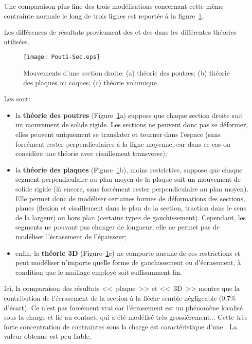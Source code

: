 Une comparaison plus fine des trois modélisations concernant cette même contrainte normale
le long de trois lignes est reportée à la figure~\ref{Pout1-sec}.

\medskip
Les différences de résultats proviennent des 
et des  dans les différentes théories utilisées.
\begin{figure}[ht]
\centering
\texttt{[image: Pout1-Sec.eps]}
\caption{Mouvements d'une section droite: (a) théorie des poutres;
(b) théorie des plaques ou coques; (c) théorie volumique}\label{Pout1-sec}
\end{figure}

\medskip
Les  sont:
\begin{itemize}
\item la \textbf{théorie des poutres} (Figure~\ref{Pout1-sec}a) suppose que chaque section droite suit un mouvement de solide rigide. Les sections ne peuvent donc pas se déformer, elles peuvent uniquement se translater et tourner dans l'espace (sans forcément rester perpendiculaires à la ligne moyenne, car dans ce cas on considère une théorie avec cisaillement transverse);
\item la \textbf{théorie des plaques} (Figure~\ref{Pout1-sec}b), moins restrictive, suppose que chaque segment perpendiculaire au plan moyen de la plaque suit un mouvement de solide rigide (là encore, sans forcément rester perpendiculaire au plan moyen). Elle permet donc de modéliser certaines formes de déformations des sections, planes (flexion et cisaillement dans le plan de la section, traction dans le sens de la largeur) ou hors plan (certains types de gauchissement). Cependant, les segments ne pouvant pas changer de longueur, elle ne permet pas de modéliser l'écrasement de l'épaisseur;
\item enfin, la \textbf{théorie 3D} (Figure~\ref{Pout1-sec}c) ne comporte aucune de ces restrictions et peut modéliser n'importe quelle forme de gauchissement ou d'écrasement, à condition que le maillage employé soit suffisamment fin.
\end{itemize}

\medskip
Ici, la comparaison des résultats <<~plaque~>> et <<~3D~>> montre que la contribution de
l'écrasement de la section à la flèche semble négligeable (0,7\% d'écart).
Ce n'est pas forcément vrai car l'écrasement est un phénomène localisé sous la charge
et lié au contact, qui a été modélisé très grossièrement...
Cette très forte concentration de contraintes sous la charge est caractéristique d'une
. La valeur obtenue est peu fiable.

